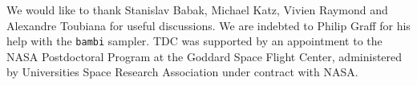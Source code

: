 \documentclass[aps,showpacs,twocolumn,prd,superscriptaddress,nofootinbib]{revtex4-1}
\begin{document}

%
%
%


\begin{acknowledgments}

We would like to thank Stanislav Babak, Michael Katz, Vivien Raymond and Alexandre Toubiana for useful discussions. We are indebted to Philip Graff for his help with the \texttt{bambi} sampler. TDC was supported by an appointment to the NASA Postdoctoral Program at the Goddard Space Flight Center, administered by Universities Space Research
Association under contract with NASA.

\end{acknowledgments}


\end{document}

